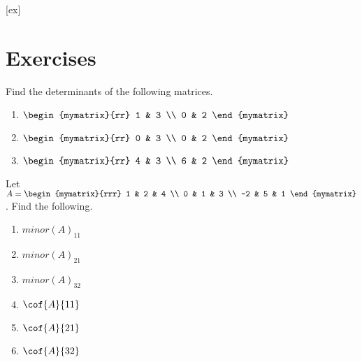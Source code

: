 [ex]
\section*{Exercises}

\begin{enumialphparenastyle}

\begin{ex} Find the determinants of the following matrices.

\begin{enumerate}
\item $\begin{mymatrix}{rr}
1 & 3 \\
0 & 2
\end{mymatrix}$

\item $\begin{mymatrix}{rr}
0 & 3 \\
0 & 2
\end{mymatrix}$

\item $\begin{mymatrix}{rr}
4 & 3 \\
6 & 2
\end{mymatrix}$
\end{enumerate}
\end{ex}

\begin{ex} Let $A = \begin{mymatrix}{rrr}
1 & 2 & 4 \\
0 & 1 & 3 \\
-2 & 5 & 1 
\end{mymatrix}$. Find the following.
\begin{enumerate}
\item $minor(A)_{11}$
\item $minor(A)_{21}$
\item $minor(A)_{32}$
\item $\cof{A}{11}$
\item $\cof{A}{21}$
\item $\cof{A}{32}$
\end{enumerate}
\end{ex}


\end{enumialphparenastyle}
